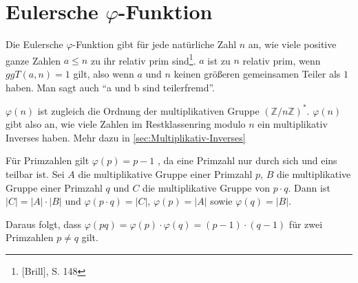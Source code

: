\section{Eulersche $\varphi$-Funktion}\label{sec:Eulersche-Phi-Funktion}
Die Eulersche $\varphi$-Funktion gibt für jede natürliche Zahl $n$ an,
wie viele positive ganze Zahlen $a \leq n $ zu ihr relativ prim sind\footnote{[Brill], S. 148}.
$a$ ist zu $n$ relativ prim, wenn $ggT(a,n) = 1$ gilt, also wenn $a$
und $n$ keinen größeren gemeinsamen Teiler als $1$ haben. Man sagt
auch "`a und b sind teilerfremd"'.

$\varphi(n)$ ist zugleich die Ordnung der multiplikativen Gruppe $(\mathbb{Z}/n \mathbb{Z})^*$.
$\varphi(n)$ gibt also an, wie viele Zahlen im Restklassenring modulo $n$ ein multiplikativ Inverses haben. Mehr dazu in \cref{sec:Multiplikativ-Inverses}

Für Primzahlen gilt $\varphi(p) = p - 1$ , da eine Primzahl nur
durch sich und eins teilbar ist. Sei $A$ die multiplikative Gruppe
einer Primzahl $p$, $B$ die multiplikative Gruppe einer Primzahl $q$
und $C$ die multiplikative Gruppe von $p \cdot q$. Dann ist $|C| = |A| \cdot |B|$ und
$\varphi(p \cdot q) = |C|$, $\varphi(p) = |A|$ sowie $\varphi(q) = |B|$.

Daraus folgt, dass $\varphi(pq) = \varphi(p) \cdot \varphi(q) = (p-1) \cdot (q - 1)$ für zwei Primzahlen $p \neq q$ gilt.

